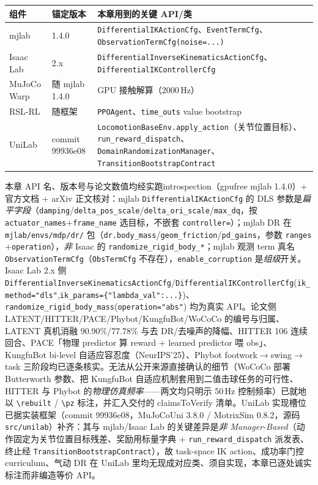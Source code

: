\begin{center}
\small
\begin{tabular}{@{}lll@{}}
\toprule
组件 & 锚定版本 & 本章用到的关键 API/类 \\
\midrule
mjlab & 1.4.0 & \verb|DifferentialIKActionCfg|、\verb|EventTermCfg|、\verb|ObservationTermCfg(noise=...)| \\
Isaac Lab & 2.x & \verb|DifferentialInverseKinematicsActionCfg|、\verb|DifferentialIKControllerCfg| \\
MuJoCo Warp & 随 mjlab 1.4.0 & GPU 接触解算（2000\,Hz） \\
RSL-RL & 随框架 & \verb|PPOAgent|、\verb|time_outs| value bootstrap \\
UniLab & commit 99936e08 & \verb|LocomotionBaseEnv.apply_action|（关节位置目标）、\verb|run_reward_dispatch|、\verb|DomainRandomizationManager|、\verb|TransitionBootstrapContract| \\
\bottomrule
\end{tabular}
\end{center}

\begin{finenote}
本章 API 名、版本号与论文数值均经实跑introspection（gpufree mjlab 1.4.0）+ 官方文档 + arXiv 正文核对：mjlab \texttt{DifferentialIKActionCfg} 的 DLS 参数是\emph{扁平字段}（\texttt{damping}/\texttt{delta\_pos\_scale}/\texttt{delta\_ori\_scale}/\texttt{max\_dq}，按 \texttt{actuator\_names}$+$\texttt{frame\_name} 选目标，不嵌套 \texttt{controller=}）；mjlab DR 在 \texttt{mjlab/envs/mdp/dr/} 包（\texttt{dr.body\_mass}/\texttt{geom\_friction}/\texttt{pd\_gains}，参数 \texttt{ranges}$+$\texttt{operation}），\emph{非} Isaac 的 \texttt{randomize\_rigid\_body\_*}；mjlab 观测 term 真名 \texttt{ObservationTermCfg}（\texttt{ObsTermCfg} 不存在），\texttt{enable\_corruption} 是\emph{组级}开关。Isaac Lab 2.x 侧 \texttt{DifferentialInverseKinematicsActionCfg}/\texttt{DifferentialIKControllerCfg}(\texttt{ik\_method="dls"},\texttt{ik\_params=\{"lambda\_val":...\}})、\texttt{randomize\_rigid\_body\_mass}(\texttt{operation="abs"}) 均为真实 API。论文侧 LATENT/HITTER/PACE/Phybot/KungfuBot/WoCoCo 的编号与归属、LATENT 真机消融 90.90\%/77.78\% 与去 DR/去噪声的降幅、HITTER 106 连续回合、PACE「物理 predictor 算 reward $+$ learned predictor 喂 obs」、KungfuBot bi-level 自适应容忍度（NeurIPS'25）、Phybot footwork$\to$swing$\to$task 三阶段均已逐条核实。无法从公开来源直接确认的细节（WoCoCo 部署 Butterworth 参数、把 KungfuBot 自适应机制套用到二值击球任务的可行性、HITTER 与 Phybot 的\emph{物理仿真频率}——两文均只明示 50\,Hz 控制频率）已就地以 \texttt{\textbackslash rebuilt} / \texttt{\textbackslash pz} 标注，并汇入交付的 claimsToVerify 清单。UniLab 实现槽位已据实装框架（commit 99936e08，MuJoCoUni 3.8.0 / MotrixSim 0.8.2，源码 \texttt{src/unilab}）补齐：其与 mjlab/Isaac Lab 的关键差异是\emph{非 Manager-Based}（动作固定为关节位置目标残差、奖励用标量字典 $+$ \texttt{run\_reward\_dispatch} 派发表、终止经 \texttt{TransitionBootstrapContract}），故 task-space IK action、成功率门控 curriculum、气动 DR 在 UniLab 里均无现成对应类、须自实现，本章已逐处诚实标注而非编造等价 API。
\end{finenote}
